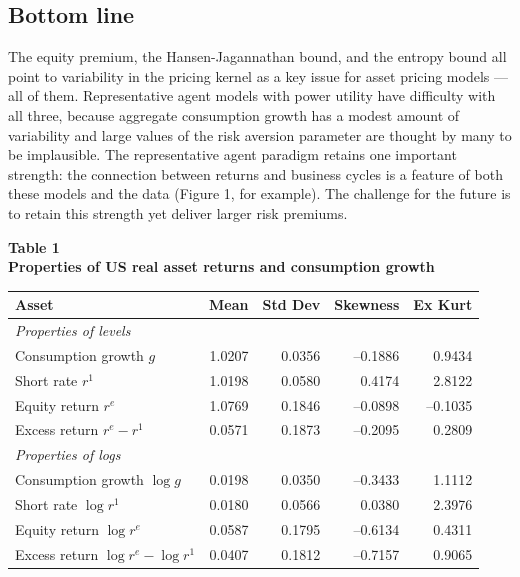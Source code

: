 \documentclass[11pt]{article}
\begin{document}
\subsection*{Bottom line}

The equity premium, the Hansen-Jagannathan bound, and the entropy bound
all point to variability in the pricing kernel as a key issue for asset pricing models
--- all of them.
Representative agent models with power utility have difficulty with all three,
because aggregate consumption growth has a modest amount of variability
and large values of the risk aversion parameter are thought by many to be
implausible.
The representative agent paradigm retains one important strength:
the connection between returns and business cycles
is a feature of both these models and the data (Figure 1, for example).
The challenge for the future is to retain this strength
yet deliver larger risk premiums.


\pagebreak
{\large\bf Table 1 \\ Properties of US real asset returns and consumption growth}

\bigskip
\tabcolsep=10pt
\begin{tabular}{lrrrr}
\toprule
Asset       & Mean  & Std Dev  & Skewness & Ex Kurt \\
\midrule
\multicolumn{3}{l}{\it Properties of levels} \\
Consumption growth $g$ \phantom{xxxxxxxxxxx}
                        & 1.0207  &  0.0356  & --0.1886 & 0.9434 \\
Short rate $r^1 $       & 1.0198  &  0.0580  &  0.4174  &  2.8122 \\
Equity return $r^e$     & 1.0769  &  0.1846  & --0.0898 & --0.1035 \\
Excess return $r^e-r^1$ & 0.0571  &  0.1873  & --0.2095 &   0.2809 \\
\midrule
\multicolumn{3}{l}{\it Properties of logs} \\
Consumption growth $\log g$  & 0.0198 & 0.0350 & --0.3433 & 1.1112  \\
Short rate $\log r^1 $       &  0.0180  & 0.0566  &  0.0380   & 2.3976 \\
Equity return $\log r^e$     &  0.0587  & 0.1795  & --0.6134  &  0.4311 \\
Excess return $\log r^e - \log r^1$ &  0.0407 & 0.1812 & --0.7157 & 0.9065 \\
\bottomrule
\end{tabular}
\end{document}
